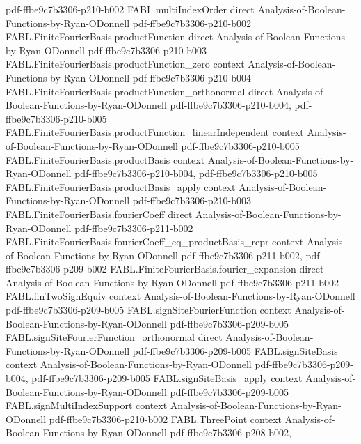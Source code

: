 \begin{theorem}
  {pdf-ffbe9c7b3306-p210-b002}
\proofstep
  {FABL.multiIndexOrder}
  {direct}
  {Analysis-of-Boolean-Functions-by-Ryan-ODonnell}
  {pdf-ffbe9c7b3306-p210-b002}
\proofstep
  {FABL.FiniteFourierBasis.productFunction}
  {direct}
  {Analysis-of-Boolean-Functions-by-Ryan-ODonnell}
  {pdf-ffbe9c7b3306-p210-b003}
\proofstep
  {FABL.FiniteFourierBasis.productFunction_zero}
  {context}
  {Analysis-of-Boolean-Functions-by-Ryan-ODonnell}
  {pdf-ffbe9c7b3306-p210-b004}
\proofstep
  {FABL.FiniteFourierBasis.productFunction_orthonormal}
  {direct}
  {Analysis-of-Boolean-Functions-by-Ryan-ODonnell}
  {pdf-ffbe9c7b3306-p210-b004,
    pdf-ffbe9c7b3306-p210-b005}
\proofstep
  {FABL.FiniteFourierBasis.productFunction_linearIndependent}
  {context}
  {Analysis-of-Boolean-Functions-by-Ryan-ODonnell}
  {pdf-ffbe9c7b3306-p210-b005}
\proofstep
  {FABL.FiniteFourierBasis.productBasis}
  {context}
  {Analysis-of-Boolean-Functions-by-Ryan-ODonnell}
  {pdf-ffbe9c7b3306-p210-b004,
    pdf-ffbe9c7b3306-p210-b005}
\proofstep
  {FABL.FiniteFourierBasis.productBasis_apply}
  {context}
  {Analysis-of-Boolean-Functions-by-Ryan-ODonnell}
  {pdf-ffbe9c7b3306-p210-b003}
\proofstep
  {FABL.FiniteFourierBasis.fourierCoeff}
  {direct}
  {Analysis-of-Boolean-Functions-by-Ryan-ODonnell}
  {pdf-ffbe9c7b3306-p211-b002}
\proofstep
  {FABL.FiniteFourierBasis.fourierCoeff_eq_productBasis_repr}
  {context}
  {Analysis-of-Boolean-Functions-by-Ryan-ODonnell}
  {pdf-ffbe9c7b3306-p211-b002,
    pdf-ffbe9c7b3306-p209-b002}
\proofstep
  {FABL.FiniteFourierBasis.fourier_expansion}
  {direct}
  {Analysis-of-Boolean-Functions-by-Ryan-ODonnell}
  {pdf-ffbe9c7b3306-p211-b002}
\proofstep
  {FABL.finTwoSignEquiv}
  {context}
  {Analysis-of-Boolean-Functions-by-Ryan-ODonnell}
  {pdf-ffbe9c7b3306-p209-b005}
\proofstep
  {FABL.signSiteFourierFunction}
  {context}
  {Analysis-of-Boolean-Functions-by-Ryan-ODonnell}
  {pdf-ffbe9c7b3306-p209-b005}
\proofstep
  {FABL.signSiteFourierFunction_orthonormal}
  {direct}
  {Analysis-of-Boolean-Functions-by-Ryan-ODonnell}
  {pdf-ffbe9c7b3306-p209-b005}
\proofstep
  {FABL.signSiteBasis}
  {context}
  {Analysis-of-Boolean-Functions-by-Ryan-ODonnell}
  {pdf-ffbe9c7b3306-p209-b004,
    pdf-ffbe9c7b3306-p209-b005}
\proofstep
  {FABL.signSiteBasis_apply}
  {context}
  {Analysis-of-Boolean-Functions-by-Ryan-ODonnell}
  {pdf-ffbe9c7b3306-p209-b005}
\proofstep
  {FABL.signMultiIndexSupport}
  {context}
  {Analysis-of-Boolean-Functions-by-Ryan-ODonnell}
  {pdf-ffbe9c7b3306-p210-b002}
\proofstep
  {FABL.ThreePoint}
  {context}
  {Analysis-of-Boolean-Functions-by-Ryan-ODonnell}
  {pdf-ffbe9c7b3306-p208-b002,
}
\end{theorem}
